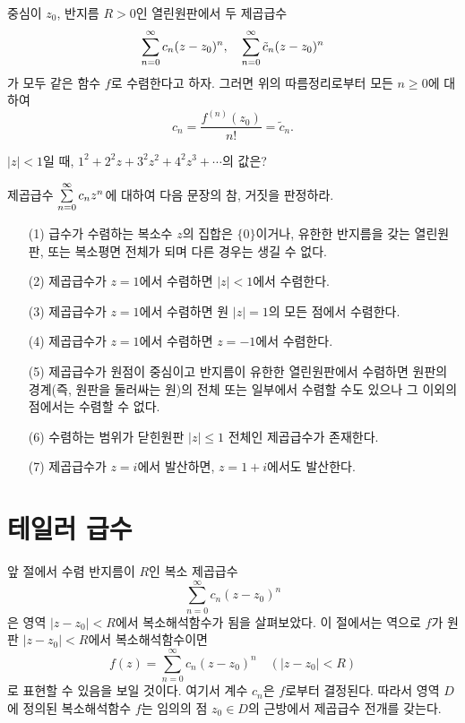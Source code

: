 \begin{salt_remark}  \label{rem-4-2}
중심이 $z_0$, 반지름 $R>0$인 열린원판에서
두 제곱급수
\[
\Sum_{n=0}^\infty c_n(z-z_0)^n, \quad %
\Sum_{n=0}^\infty \tilde c_n(z-z_0)^n
\]
가 모두 같은 함수 $f$로 수렴한다고 하자.
그러면 위의 따름정리로부터 모든 $n\ge0$에 대하여
\[
c_n = \dfrac{f^{(n)}(z_0)}{n!} = \tilde c_n.
\]
\end{salt_remark}

\begin{salt_exercise} \label{ex-4-10}
$|z|<1$일 때,
$1^2 + 2^2z + 3^2z^2 + 4^2z^3 + \cdots$의 값은?
\end{salt_exercise}

\begin{salt_exercise} \label{ex-4-11}
제곱급수 $\sum\limits_{n=0}^\infty c_nz^n$에 대하여 다음 문장의 참, 거짓을 판정하라.
\begin{itemize}
\item[(1)] 급수가 수렴하는  복소수 $z$의 집합은 $\{0\}$이거나, 유한한 반지름을 갖는 열린원판,
또는 복소평면 전체가 되며 다른 경우는 생길 수 없다.
\item[(2)] 제곱급수가 $z=1$에서 수렴하면 $|z|<1$에서 수렴한다.
\item[(3)] 제곱급수가 $z=1$에서 수렴하면 원 $|z|=1$의 모든 점에서 수렴한다.
\item[(4)] 제곱급수가 $z=1$에서 수렴하면 $z=-1$에서 수렴한다.
\item[(5)] 제곱급수가 원점이 중심이고 반지름이 유한한 열린원판에서 수렴하면
원판의 경계(즉, 원판을 둘러싸는 원)의 전체 또는 일부에서 수렴할 수도 있으나
그 이외의 점에서는 수렴할 수 없다.
\item[(6)] 수렴하는 범위가 닫힌원판 $|z|\le 1$ 전체인 제곱급수가 존재한다.
\item[(7)] 제곱급수가 $z=i$에서 발산하면, $z=1+i$에서도 발산한다.
\end{itemize}
\end{salt_exercise}

\section{테일러 급수} \label{section-4-3}

앞 절에서 수렴 반지름이 $R$인 복소 제곱급수
\[
\sum_{n=0}^\infty c_n(z-z_0)^n
\]
은 영역 $|z-z_0|<R$에서 복소해석함수가 됨을 살펴보았다.
이 절에서는 역으로 $f$가 원판 $|z-z_0|<R$에서 복소해석함수이면
\[
f(z) = \sum_{n=0}^\infty c_n (z-z_0)^n \quad (|z-z_0|<R)
\]
로 표현할 수 있음을 보일 것이다. 여기서 계수 $c_n$은 $f$로부터 결정된다.
따라서 영역 $D$에 정의된 복소해석함수 $f$는 임의의 점 $z_0\in D$의 근방에서
제곱급수 전개를 갖는다.

